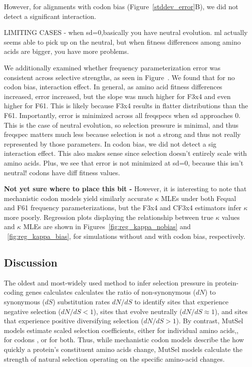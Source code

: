 \documentclass[11pt]{article}
\begin{document}
 
However, for alignments with codon bias (Figure~\ref{stddev_error}B), we did not detect a significant interaction.


LIMITING CASES - when sd=0,basically you have neutral evolution. ml actually seems able to pick up on the neutral, but when fitness differences among amino acids are bigger, you have more problems.



We additionally examined whether frequency parameterization error was consistent across selective strengths, as seen in Figure~. We found that for no codon bias, interaction effect. In general, as amino acid fitness differences increased, error increased, but the slope was much higher for F3x4 and even higher for F61. This is likely because F3x4 results in flatter distributions than the F61. Importantly, error is minimized across all freqspecs when sd approaches 0. This is the case of neutral evolution, so selection pressure is minimal, and thus freqspec matters much less because selection is not a strong and thus not really represented by those parameters.
In codon bias, we did not detect a sig interaction effect. This also makes sense since selection doesn't entirely scale with amino acids. Plus, we see that error is not minimized at sd=0, because this isn't neutral! codons have diff fitness values. 



\textbf{Not yet sure where to place this bit - } However, it is interesting to note that mechanistic codon models yield similarly accurate $\kappa$ MLEs under both Fequal and F61 frequency parameterizations, but the F3x4 and CF3x4 estimators infer $\kappa$ more poorly. Regression plots displaying the relationship between true $\kappa$ values and $\kappa$ MLEs are shown in Figures~\ref{fig:reg_kappa_nobias} and ~\ref{fig:reg_kappa_bias}, for simulations without and with codon bias, respectively.




\subsection*{Discussion}
The oldest and most-widely used method to infer selection pressure in protein-coding genes calculates calculates the ratio of non-synonymous ($dN$) to synonymous ($dS$) substitution rates $dN/dS$ to identify sites that experience negative selection ($dN/dS<1$), sites that evolve neutrally ($dN/dS\approx1$), and sites that experience positive diversifying selection ($dN/dS>1$). By contrast, MutSel models estimate scaled selection coefficients, either for individual amino acids,\cite{HalpernBruno1998,NielsenYang2008,Rodrigueetal2010,Tamurietal2012,Tamurietal2014}, for codons \cite{YangNielsen2008}, or for both. Thus, while mechanistic codon models describe the how quickly a protein's constituent amino acids change, MutSel models calculate the strength of natural selection operating on the specific amino-acid changes.  
\end{document}
